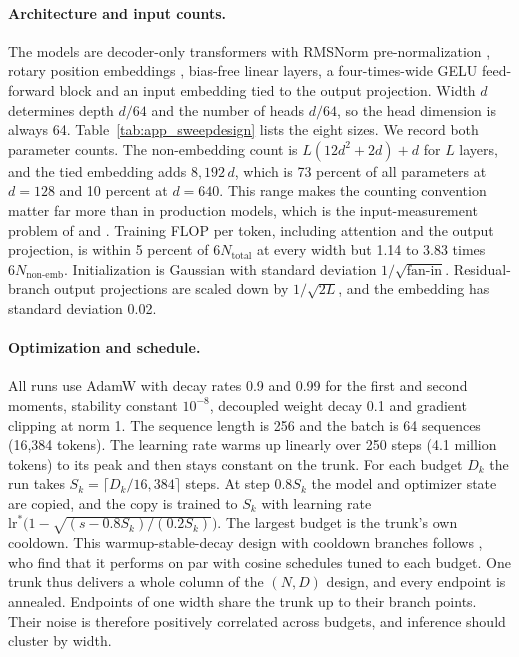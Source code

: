 \paragraph{Architecture and input counts.}
The models are decoder-only transformers with RMSNorm pre-normalization \citep{zhang2019root}, rotary position
embeddings \citep{su2024roformer}, bias-free linear layers, a four-times-wide GELU feed-forward block and an input
embedding tied to the output projection. Width $d$ determines depth $d/64$ and the number of heads $d/64$, so the head
dimension is always 64. Table~\ref{tab:app_sweepdesign} lists the eight sizes. We record both parameter counts. The
non-embedding count is $L(12d^2+2d)+d$ for $L$ layers, and the tied embedding adds $8{,}192\,d$, which is 73 percent of
all parameters at $d=128$ and 10 percent at $d=640$. This range makes the counting convention matter far more than in
production models, which is the input-measurement problem of \citet{pearce2024reconciling} and
\citet{porian2024resolving}. Training FLOP per token, including attention and the output projection, is within 5
percent of $6N_{\text{total}}$ at every width but 1.14 to 3.83 times $6N_{\text{non-emb}}$. Initialization is Gaussian
with standard deviation $1/\sqrt{\text{fan-in}}$. Residual-branch output projections are scaled down by
$1/\sqrt{2L}$, and the embedding has standard deviation 0.02.



\paragraph{Optimization and schedule.}
All runs use AdamW \citep{loshchilov2019decoupled} with decay rates 0.9 and 0.99 for the first and second moments,
stability constant $10^{-8}$, decoupled weight decay 0.1 and gradient clipping at norm 1. The sequence length is 256 and the batch is 64 sequences (16,384
tokens). The learning rate warms up linearly over 250 steps (4.1 million tokens) to its peak and then stays constant on
the trunk. For each budget $D_k$ the run takes $S_k=\lceil D_k/16{,}384\rceil$ steps. At step $0.8S_k$ the model and
optimizer state are copied, and the copy is trained to $S_k$ with learning rate
$\mathrm{lr}^{*}\bigl(1-\sqrt{(s-0.8S_k)/(0.2S_k)}\bigr)$. The largest budget is the trunk's own cooldown. This
warmup-stable-decay design with cooldown branches follows \citet{hagele2024scaling}, who find that it performs on par
with cosine schedules tuned to each budget. One trunk thus delivers a whole column of the $(N,D)$ design, and every endpoint is
annealed. Endpoints of one width share the trunk up to their branch points. Their noise is therefore positively correlated
across budgets, and inference should cluster by width.

